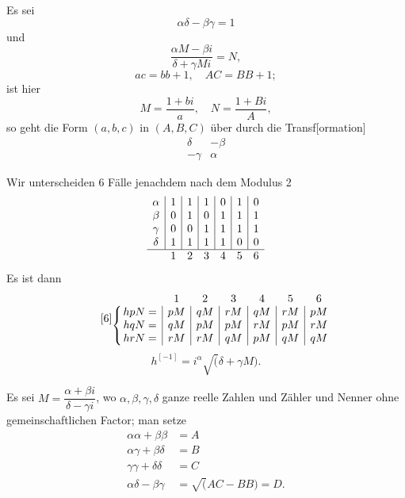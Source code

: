 \par\indent Es sei
\[\alpha\delta-\beta\gamma=1\]
\noindent und
\[\frac{\alpha M-\beta i}{\delta+\gamma Mi}=N,\]
\[ac=bb+1,\quad AC=BB+1;\]
\noindent ist hier
\[M=\frac{1+bi}a,\quad N=\frac{1+Bi}A,\]
\noindent so geht die Form \((a,b,c)\) in \((A,B,C)\) über durch die Transf[ormation]
\[\begin{array}{rr}\delta&-\beta\\-\gamma&\alpha\end{array}\]
\par\indent Wir unterscheiden 6 Fälle jenachdem nach dem Modulus 2
\[\begin{array}{c|c|c|c|c|c|c}
\alpha&1&1&1&0&1&0\\
\beta&0&1&0&1&1&1\\
\gamma&0&0&1&1&1&1\\
\delta&1&1&1&1&0&0\\\hline
\multicolumn{1}{c}{}&\multicolumn{1}{c}{1}&\multicolumn{1}{c}{2}&\multicolumn{1}{c}{3}&\multicolumn{1}{c}{4}&\multicolumn{1}{c}{5}&\multicolumn{1}{c}{6}
\end{array}\]
\noindent Es ist dann
\begin{equation*}\tag*{[6]}
\begin{array}{@{}c@{}c|c|c|c|c|c|c}
&\multicolumn{1}{c}{}&\multicolumn{1}{c}{1}&\multicolumn{1}{c}{2}&\multicolumn{1}{c}{3}&\multicolumn{1}{c}{4}&\multicolumn{1}{c}{5}&\multicolumn{1}{c}{6}\\
\smash{\raisebox{-1\normalbaselineskip}{$\displaystyle\left\{\vphantom{\begin{array}{c}a\\a\\a\end{array}}\right.$}}&hpN=&pM&qM&rM&qM&rM&pM\\
&hqN=&qM&pM&pM&rM&pM&rM\\
&hrN=&rM&rM&qM&pM&qM&qM
\end{array}
\end{equation*}
\[h^{[-1]}=i^\alpha\surd(\delta+\gamma M).\]
\clearpage{}
\par\indent Es sei \(M=\dfrac{\alpha+\beta i}{\delta-\gamma i}\), wo \(\alpha,\beta,\gamma,\delta\) ganze reelle Zahlen und Zähler und Nenner ohne gemeinschaftlichen Factor; man setze
\[\begin{aligned}
\alpha\alpha+\beta\beta&=A\\
\alpha\gamma+\beta\delta&=B\\
\gamma\gamma+\delta\delta&=C\\
\alpha\delta-\beta\gamma&=\surd(AC-BB)=D.
\end{aligned}\]
